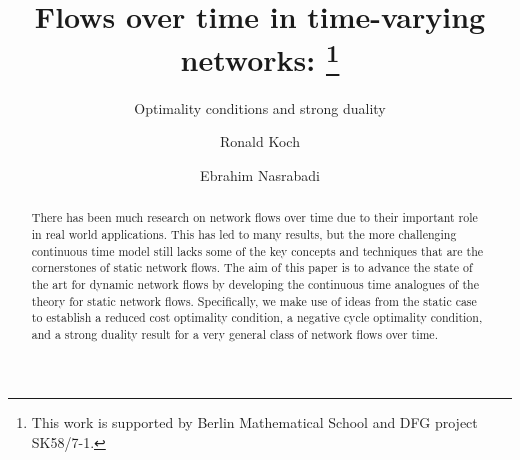 \documentclass{svjour3}                     \smartqed
\begin{document}
\title{Flows over time in time-varying networks: \thanks{This work is supported by Berlin Mathematical School and DFG project SK58/7-1.}
}
\subtitle{Optimality conditions and strong duality}


\author{Ronald Koch\and Ebrahim Nasrabadi}




\date{}



\maketitle


\begin{abstract}

There has been much research on network flows over time due to their important role in real world applications. This has led to many results, but the more challenging continuous time model still lacks some of the key concepts and techniques that are the cornerstones of static network flows. The aim of this paper is to advance the state of the art for dynamic network flows by developing the continuous time analogues of the theory for static network flows. Specifically, we make use of ideas from the static case to establish a reduced cost optimality condition, a negative cycle optimality condition, and a strong duality result for a very general class of network flows over time. 














\end{abstract}
\end{document}
